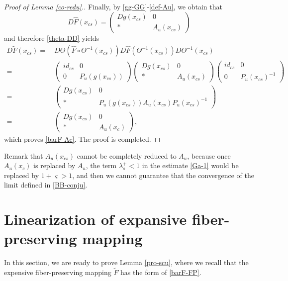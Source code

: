 \documentclass[reqno]{amsart}
\numberwithin{equation}{section}
\begin{document}
\begin{proof}[Proof of Lemma {\rm \ref{co-redu}}.]
Finally, by \eqref{gg-GG}-\eqref{def-Au}, we obtain that
$$
D\hat F(x_{cs})=
\left(
\begin{array}{ccc}
Dg(x_{cs})& 0
\\
* & A_u(x_{cs})
\end{array}
\right)
$$
and therefore \eqref{theta-DD} yields
\begin{align*}
D\tilde{F}(x_{cs})
=&~D\Theta(\hat F\circ \Theta^{-1}(x_{cs}))D\hat F(\Theta^{-1}(x_{cs}))D\Theta^{-1}(x_{cs})
\\
=&~\left(
\begin{array}{ccc}
id_{cs}& 0
\\
0 & P_u(g(x_{cs}))
\end{array}
\right)
\left(
\begin{array}{ccc}
Dg(x_{cs})& 0
\\
* & A_u(x_{cs})
\end{array}
\right)
\left(
\begin{array}{ccc}
id_{cs}& 0
\\
0 & P_u(x_{cs})^{-1}
\end{array}
\right)
\\
=&~\left(
\begin{array}{ccc}
Dg(x_{cs})& 0
\\
* & P_u(g(x_{cs}))A_u(x_{cs})P_u(x_{cs})^{-1}
\end{array}
\right)
\\
=&~
\left(
\begin{array}{ccc}
Dg(x_{cs})& 0
\\
* & A_u(x_{c})
\end{array}
\right),
\end{align*}
which proves \eqref{barF-Ac}. The proof is completed.
\end{proof}

Remark that $A_u(x_{cs})$ cannot be completely reduced to $A_u$, because once $A_u(x_c)$ is replaced by $A_u$, the term $\lambda_s^+<1$ in the estimate \eqref{Ga-1} would be replaced by $1+\varsigma>1$, and then we cannot guarantee that the convergence of the limit defined in \eqref{BB-conju}.


\section{Linearization of expansive fiber-preserving mapping}\label{Sec-7}

In this section, we are ready to prove  Lemma  \ref{pro-scu}, where we recall that the expensive fiber-preserving mapping $\tilde{F}$ has the form of \eqref{barF-FP}.
\end{document}
